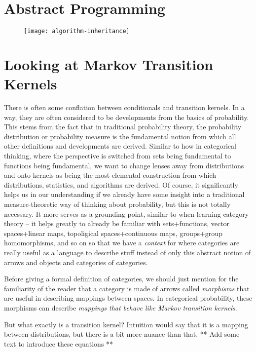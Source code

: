 \section{Abstract Programming}

\begin{figure}[htb]
    \texttt{[image: algorithm-inheritance]}
	\caption{}
    \label{fig:algorithm-inheritance}
\end{figure}

\section{Looking at Markov Transition Kernels}

There is often some conflation between conditionals and transition kernels.
In a way, they are often considered to be developments from the basics of probability.
This stems from the fact that in traditional probability theory, the probability distribution or probability measure is the fundamental notion from which all other definitions and developments are derived.
Similar to how in categorical thinking, where the perspective is switched from sets being fundamental to functions being fundamental, we want to change lenses away from distributions and onto kernels as being the most elemental construction from which distributions, statistics, and algorithms are derived. 
Of course, it significantly helps us in our understanding if we already have some insight into a traditional measure-theoretic way of thinking about probability, but this is not totally necessary.
It more serves as a grounding point, similar to when learning category theory -- it helps greatly to already be familiar with sets+functions, vector spaces+linear maps, topoligical spaces+continuous maps, groups+group homomorphisms, and so on so that we have a \emph{context} for where categories are really useful as a language to describe stuff instead of only this abstract notion of arrows and objects and categories of categories.

Before giving a formal definition of categories, we should just mention for the familiarity of the reader that a category is made of arrows called \emph{morphisms} that are useful in describing mappings between spaces. In categorical probability, these morphisms can describe \emph{mappings that behave like Markov transition kernels}.

But what exactly is a transition kernel?
Intuition would say that it is a mapping between distributions, but there is a bit more nuance than that. ** Add some text to introduce these equations **

